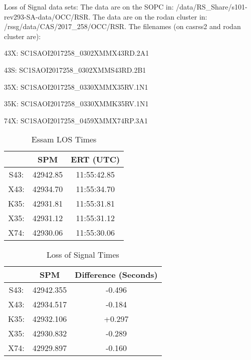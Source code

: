 \documentclass[crop=false,class=article,oneside]{standalone}
\begin{document}
\par
Loss of Signal data sets:
The data are on the SOPC in:
/data/RS\_Share/s101-rev293-SA-data/OCC/RSR. The data are on the rodan cluster in: /rssg/data/CAS/2017\_258/OCC/RSR. The filenames (on casrss2 and rodan cluster are):
\begin{itemize}
\begin{multicols}{2}
    \item 43X: SC1SAOI2017258\_0302XMMX43RD.2A1
    \item 43S: SC1SAOI2017258\_0302XMMS43RD.2B1
    \item 35X: SC1SAOI2017258\_0330XMMX35RV.1N1
    \item 35K: SC1SAOI2017258\_0330XMMK35RV.1N1
    \item 74X: SC1SAOI2017258\_0459XMMX74RP.3A1
\end{multicols}
\end{itemize}
\begin{table}[H]
    \centering
    \caption{Essam LOS Times}
    \begin{tabular}{c c c} 
        \hline
         & SPM      & ERT (UTC)    \\ 
        \hline
        S43: & 42942.85 & 11:55:42.85  \\
        X43: & 42934.70 & 11:55:34.70  \\
        K35: & 42931.81 & 11:55:31.81  \\
        X35: & 42931.12 & 11:55:31.12  \\
        X74: & 42930.06 & 11:55:30.06  \\
        \hline
    \end{tabular}
\end{table}
\begin{table}[H]
    \centering
    \caption{Loss of Signal Times}
    \begin{tabular}{c c c} 
        \hline
        & SPM      & Difference (Seconds)    \\ 
        \hline
        S43: & 42942.355 & -0.496    \\
        X43: & 42934.517 & -0.184    \\
        K35: & 42932.106 & +0.297    \\
        X35: & 42930.832 & -0.289    \\
        X74: & 42929.897 & -0.160    \\
        \hline
    \end{tabular}
\end{table}
\end{document}

